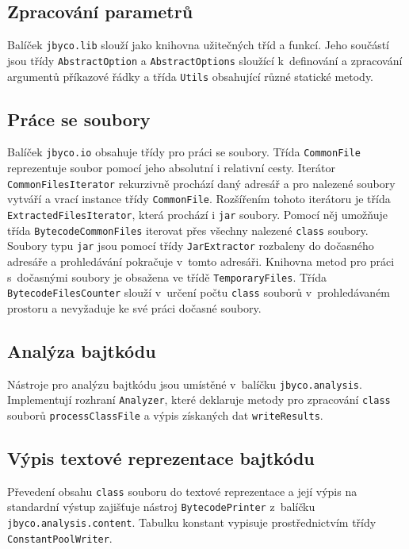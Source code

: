 \subsection{Zpracování parametrů}

Balíček \texttt{jbyco.lib} slouží jako knihovna užitečných tříd a funkcí. Jeho součástí jsou třídy \texttt{AbstractOption} a \texttt{AbstractOptions} sloužící k~definování a zpracování argumentů příkazové řádky a třída \texttt{Utils} obsahující různé statické metody. 

\subsection{Práce se soubory}

Balíček \texttt{jbyco.io} obsahuje třídy pro práci se soubory. Třída \texttt{CommonFile} reprezentuje soubor pomocí jeho absolutní i relativní cesty. Iterátor \texttt{CommonFilesIterator} rekurzivně prochází daný adresář a pro nalezené soubory vytváří a vrací instance třídy \texttt{CommonFile}. Rozšířením tohoto iterátoru je třída \texttt{ExtractedFilesIterator}, která prochází i \texttt{jar} soubory. Pomocí něj umožňuje třída \texttt{BytecodeCommonFiles} iterovat přes všechny nalezené \texttt{class} soubory. Soubory typu \texttt{jar} jsou pomocí třídy \texttt{JarExtractor} rozbaleny do dočasného adresáře a prohledávání pokračuje v~tomto adresáři. Knihovna metod pro práci s~dočasnými soubory je obsažena ve třídě \texttt{TemporaryFiles}. Třída \texttt{BytecodeFilesCounter} slouží v~určení počtu \texttt{class} souborů v~prohledávaném prostoru a nevyžaduje ke své práci dočasné soubory. 

\subsection{Analýza bajtkódu}

Nástroje pro analýzu bajtkódu jsou umístěné v~balíčku \texttt{jbyco.analysis}. Implementují rozhraní \texttt{Analyzer}, které deklaruje metody pro zpracování \texttt{class} souborů \texttt{processClassFile} a výpis získaných dat \texttt{writeResults}. 

\subsection{Výpis textové reprezentace bajtkódu}

Převedení obsahu \texttt{class} souboru do textové reprezentace a její výpis na standardní výstup zajišťuje nástroj \texttt{BytecodePrinter} z~balíčku \texttt{jbyco.analysis.content}. Tabulku konstant vypisuje prostřednictvím třídy \texttt{ConstantPoolWriter}.  

